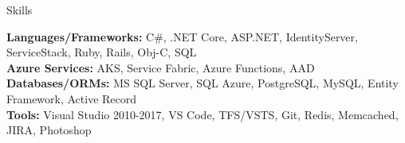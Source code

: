 \documentclass{resume} %
\begin{document}

\begin{rSection}{Skills}


\textbf{Languages/Frameworks:} C\#, .NET Core, ASP.NET, IdentityServer, ServiceStack, Ruby, Rails, Obj-C, SQL  \\
\textbf{Azure Services:} AKS, Service Fabric, Azure Functions, AAD \\
\textbf{Databases/ORMs:} MS SQL Server, SQL Azure, PostgreSQL, MySQL, Entity Framework, Active Record  \\
\textbf{Tools:} Visual Studio 2010-2017, VS Code, TFS/VSTS, Git, Redis, Memcached, JIRA, Photoshop

\end{rSection}

\end{document}
